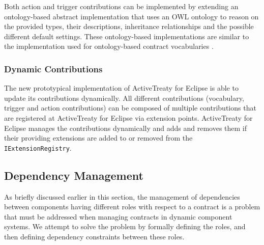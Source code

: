 \documentclass{llncs}
\begin{document}
Both action and trigger contributions can be implemented by extending an ontology-based abstract implementation that uses an OWL ontology to reason on the provided types, their descriptions, inheritance relationships and the possible different default settings. These ontology-based implementations are similar to the implementation used for ontology-based contract vocabularies \cite{Treaty.JOT2009}.

\subsubsection{Dynamic Contributions}

The new prototypical implementation of ActiveTreaty for Eclipse is able to update its contributions dynamically. All different contributions (vocabulary, trigger and action contributions) can be composed of multiple contributions that are registered at ActiveTreaty for Eclipse via extension points. ActiveTreaty for Eclipse manages the contributions dynamically and adds and removes them if their providing extensions are added to or removed from the \texttt{IExtensionRegistry}.


\subsection{Dependency Management}

As briefly discussed earlier in this section, the management of dependencies between components having different roles with respect to a contract is a problem that must be addressed when managing contracts in dynamic component systems. We attempt to solve the problem by formally defining the roles, and then defining dependency constraints between these roles. 
\end{document}
